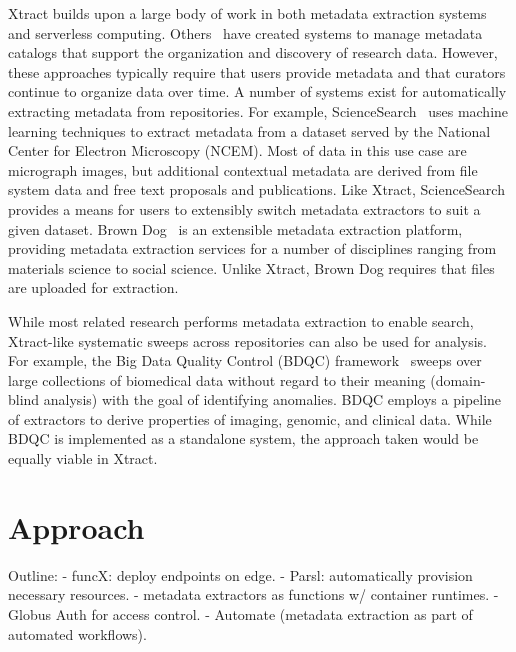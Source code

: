 \documentclass[sigconf]{acmart}
\newcommand{\name}{Xtract}
\begin{document}
%
%
%

\name{} builds upon a large body of work in both metadata extraction systems and serverless computing.
Others~\cite{egan2003vizier, welter2013nhgri, irods, dataverse} have created 
systems to manage metadata catalogs that
support the organization and discovery of research data. However, these approaches typically 
require that users provide metadata and that curators continue to organize data over time. 
A number of systems exist for automatically extracting metadata from repositories. 
For example, ScienceSearch~\cite{rodrigo2018sciencesearch} uses 
machine learning techniques to extract metadata from a dataset served by the National Center for Electron Microscopy (NCEM). 
Most of data in this use case are micrograph images, but additional contextual metadata are derived from file system 
data and free text proposals and publications. Like \name{}, ScienceSearch 
provides a means for users to extensibly switch metadata extractors to suit a given dataset.  
Brown Dog~\cite{padhy2015brown} is an extensible metadata extraction platform, 
providing metadata extraction services for a number of 
disciplines ranging from materials science to social science.
Unlike \name{}, Brown Dog requires that files are uploaded for extraction. 

While most related research performs metadata extraction to enable search,
\name{}-like systematic sweeps across repositories can also be used for analysis.  
For example, the Big Data Quality Control (BDQC) framework~\cite{deutsch2018bdqc} sweeps over 
large collections of biomedical data without regard to their meaning (domain-blind analysis) with the goal of
identifying anomalies.
BDQC employs a pipeline of extractors to derive properties of imaging, genomic, and clinical data.
While BDQC is implemented as a standalone system, the approach taken would be equally 
viable in \name{}.

\section{Approach}
\label{sec:approach}
Outline: 
- funcX: deploy endpoints on edge. 
     - Parsl: automatically provision necessary resources. 
- metadata extractors as functions w/ container runtimes. 
- Globus Auth for access control. 
- Automate (metadata extraction as part of automated workflows). 
\end{document}
